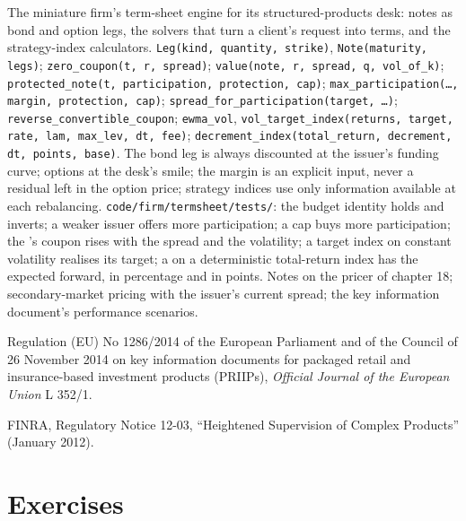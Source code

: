 \begin{build}
 The miniature firm's term-sheet engine for its structured-products desk: notes as bond and option legs, the solvers that
turn a client's request into terms, and the strategy-index calculators.
 \texttt{Leg(kind, quantity, strike)}, \texttt{Note(maturity, legs)}; \texttt{zero\_coupon(t, r, spread)};
\texttt{value(note, r, spread, q, vol\_of\_k)}; \texttt{protected\_note(t, participation, protection, cap)};
\texttt{max\_participation(\ldots, margin, protection, cap)}; \texttt{spread\_for\_participation(target, \ldots)};
\texttt{reverse\_convertible\_coupon}; \texttt{ewma\_vol}, \texttt{vol\_target\_index(returns, target, rate, lam, max\_lev, dt, fee)};
\texttt{decrement\_index(total\_return, decrement, dt, points, base)}.
 The bond leg is always discounted at the issuer's funding curve; options at the desk's smile; the margin is an explicit input,
never a residual left in the option price; strategy indices use only information available at each rebalancing.
 \texttt{code/firm/termsheet/tests/}: the budget identity holds and inverts; a weaker issuer offers more
participation; a cap buys more participation; the 's coupon rises with the spread and the volatility; a target index on
constant volatility realises its target; a  on a deterministic total-return index has the expected forward, in percentage and
in points.
 Notes on the  pricer of chapter 18; secondary-market pricing with the issuer's current spread; the key information
document's performance scenarios.
\end{build}

\begin{omsources}
\item Regulation (EU) No 1286/2014 of the European Parliament and of the Council of 26 November 2014 on key information documents for
packaged retail and insurance-based investment products (PRIIPs), \emph{Official Journal of the European Union} L 352/1.
\item FINRA, Regulatory Notice 12-03, ``Heightened Supervision of Complex Products'' (January 2012).
\end{omsources}

\section{Exercises}

